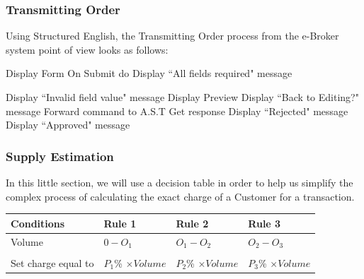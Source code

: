 \documentclass{article}
\begin{document}
\subsubsection{Transmitting Order}
Using Structured English, the Transmitting Order process from the e-Broker system point of view looks as follows:\\
\begin{algorithmic}[H]
  	\STATE Display Form
  	\STATE On Submit do
  		\STATE Display ``All fields required" message
   
  		\STATE Display ``Invalid field value" message
  	\ELSE
  		\STATE Display Preview
  		\STATE Display ``Back to Editing?" message
  	\ENDIF
 \ENDWHILE
 \STATE Forward command to A.S.T
 \STATE Get response
  	\STATE Display ``Rejected" message
 \ELSE
  	\STATE Display ``Approved" message
 \ENDIF

\end{algorithmic}

\subsubsection{Supply Estimation}
In this little section, we will use a decision table in order to help us simplify the complex process of calculating the exact charge of a Customer for a transaction.
\begin{table}[]
\begin{tabular}{|l|l|l|l|}
\hline
\rowcolor[HTML]{EFEFEF} 
\textbf{Conditions} & Rule 1               & Rule 2               & Rule 3               \\ \hline
Volume              & $0 - O_1$            & $O_1-O_2$            & $O_2-O_3$            \\ \hline
\rowcolor[HTML]{EFEFEF} 
\multicolumn{4}{|l|}{\cellcolor[HTML]{EFEFEF}\textbf{Actions}}                           \\ \hline
Set charge equal to & $P_1$\% $\times Volume$ & $P_2$\% $\times Volume$ & $P_3$\% $\times Volume$ \\ \hline
\end{tabular}
\end{table}
\end{document}
